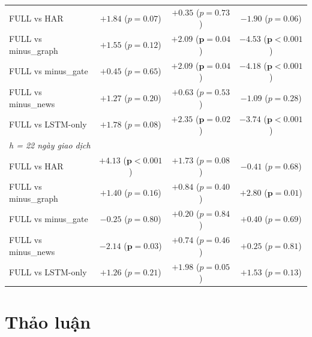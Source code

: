 \documentclass[runningheads]{llncs}
\begin{document}
\begin{table}[t]
\begin{tabular}{lccc}
FULL vs HAR         & $+1.84$ ($p = 0.07$) & $+0.35$ ($p = 0.73$) & $-1.90$ ($p = 0.06$) \\
FULL vs minus\_graph & $+1.55$ ($p = 0.12$) & $\mathbf{+2.09}$ ($\mathbf{p = 0.04}$) & $\mathbf{-4.53}$ ($\mathbf{p<0.001}$) \\
FULL vs minus\_gate  & $+0.45$ ($p = 0.65$) & $\mathbf{+2.09}$ ($\mathbf{p = 0.04}$) & $\mathbf{-4.18}$ ($\mathbf{p<0.001}$) \\
FULL vs minus\_news  & $+1.27$ ($p = 0.20$) & $+0.63$ ($p = 0.53$) & $-1.09$ ($p = 0.28$) \\
FULL vs LSTM-only   & $+1.78$ ($p = 0.08$) & $\mathbf{+2.35}$ ($\mathbf{p = 0.02}$) & $\mathbf{-3.74}$ ($\mathbf{p<0.001}$) \\
\midrule
\multicolumn{4}{l}{\textit{h = 22 ngày giao dịch}}\\
FULL vs HAR         & $\mathbf{+4.13}$ ($\mathbf{p<0.001}$) & $+1.73$ ($p = 0.08$) & $-0.41$ ($p = 0.68$) \\
FULL vs minus\_graph & $+1.40$ ($p = 0.16$) & $+0.84$ ($p = 0.40$) & $\mathbf{+2.80}$ ($\mathbf{p = 0.01}$) \\
FULL vs minus\_gate  & $-0.25$ ($p = 0.80$) & $+0.20$ ($p = 0.84$) & $+0.40$ ($p = 0.69$) \\
FULL vs minus\_news  & $\mathbf{-2.14}$ ($\mathbf{p = 0.03}$) & $+0.74$ ($p = 0.46$) & $+0.25$ ($p = 0.81$) \\
FULL vs LSTM-only   & $+1.26$ ($p = 0.21$) & $+1.98$ ($p = 0.05$) & $+1.53$ ($p = 0.13$) \\
\bottomrule
\end{tabular}
\end{table}

\section{Thảo luận}
\label{sec:discussion}
\end{document}
